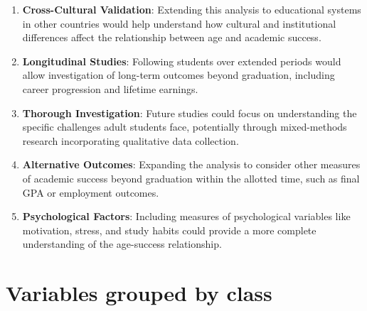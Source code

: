 \documentclass{article}
\begin{document}
\begin{enumerate}
    \item \textbf{Cross-Cultural Validation}: Extending this analysis to educational systems in other countries would help understand how cultural and institutional differences affect the relationship between age and academic success.

    \item \textbf{Longitudinal Studies}: Following students over extended periods would allow investigation of long-term outcomes beyond graduation, including career progression and lifetime earnings.

    \item \textbf{Thorough Investigation}: Future studies could focus on understanding the specific challenges adult students face, potentially through mixed-methods research incorporating qualitative data collection.

    \item \textbf{Alternative Outcomes}: Expanding the analysis to consider other measures of academic success beyond graduation within the allotted time, such as final GPA or employment outcomes.
    
    \item \textbf{Psychological Factors}: Including measures of psychological variables like motivation, stress, and study habits could provide a more complete understanding of the age-success relationship.
\end{enumerate}




\appendix

\newpage
\section{Variables grouped by class}
\end{document}
